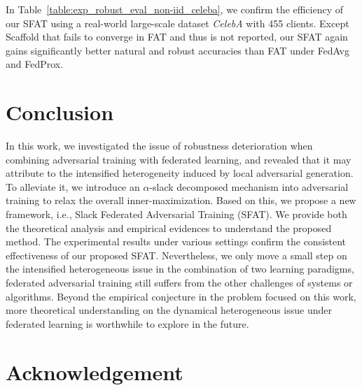 \documentclass{article} %
\theoremstyle{plain}
\theoremstyle{definition}
\theoremstyle{remark}
\begin{document}
In Table~\ref{table:exp_robust_eval_non-iid_celeba}, we confirm the efficiency of our SFAT using a real-world large-scale dataset \textit{CelebA} with 455 clients. Except Scaffold that fails to converge in FAT and thus is not reported, our SFAT again gains significantly better natural and robust accuracies than FAT under FedAvg and FedProx.
\fi

\section{Conclusion}

In this work, we investigated the issue of robustness deterioration when combining adversarial training with federated learning, and revealed that it may attribute to the intensified heterogeneity induced by local adversarial generation. To alleviate it, we introduce an $\alpha$-slack decomposed mechanism into adversarial training to relax the overall inner-maximization. Based on this, we propose a new framework, i.e., Slack Federated Adversarial Training (SFAT). We provide both the theoretical analysis and empirical evidences to understand the proposed method. The experimental results under various settings confirm the consistent effectiveness of our proposed SFAT. Nevertheless, we only move a small step on the intensified heterogeneous issue in the combination of two learning paradigms, federated adversarial training still suffers from the other challenges of systems or algorithms. Beyond the empirical conjecture in the problem focused on this work, more theoretical understanding on the dynamical heterogeneous issue under federated learning is worthwhile to explore in the future. 



\clearpage

\section*{Acknowledgement}
\end{document}
